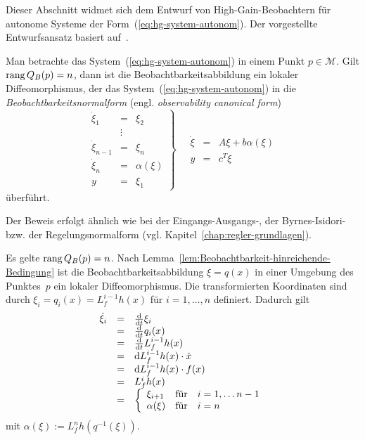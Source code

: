 Dieser Abschnitt widmet sich dem Entwurf von High-Gain-Beobachtern
für autonome Systeme der Form~(\ref{eq:hg-system-autonom}). Der
vorgestellte Entwurfsansatz basiert auf~\cite{gauthier92,ciccarella93,dalla-mora1997}.
\begin{theorem}
\label{thm:hg-beobachtbarkeitsnormalform}Man betrachte das System~(\ref{eq:hg-system-autonom})
in einem Punkt $p\in\mathcal{M}$. Gilt ${\operatorname{rang}}\,Q_{B}(p)=n$, dann
ist die Beobachtbarkeitsabbildung ein lokaler Diffeomorphismus, der
das System~(\ref{eq:hg-system-autonom}) in die \emph{Beobachtbarkeitsnormalform}
(engl. \emph{observability canonical form})
\begin{equation}
\left.\begin{array}{lcl}
\dot{\xi}_{1} & = & \xi_{2}\\
 & \vdots\\
\dot{\xi}_{n-1} & = & \xi_{n}\\
\dot{\xi}_{n} & = & \alpha(\xi)\\
y & = & \xi_{1}
\end{array}\right\} \quad\begin{array}{rcl}
\dot{\xi} & = & A\xi+b\alpha(\xi)\\
y & = & c^{T}\xi
\end{array}\label{eq:Beobachtbarkeits-NF-autonom}
\end{equation}
überführt.
\end{theorem}
Der Beweis erfolgt ähnlich wie bei der Eingangs-Ausgangs-, der Byrnes-Isidori-
bzw. der Regelungsnormalform (vgl. Kapitel~\ref{chap:regler-grundlagen}).
\begin{svmultproof2}
Es gelte ${\operatorname{rang}}\,Q_{B}(p)=n$. Nach Lemma~\ref{lem:Beobachtbarkeit-hinreichende-Bedingung}
ist die Beobachtbarkeitsabbildung $\xi=q(x)$ in einer Umgebung des
Punktes~$p$ ein lokaler Diffeomorphismus. Die transformierten Koordinaten
sind durch $\xi_{i}=q_{i}(x)=L_{f}^{i-1}h(x)$ für $i=1,\ldots,n$
definiert. Dadurch gilt
\[
\begin{array}{lcl}
\dot{\xi}_{i} & = & \frac{{\mathrm{d}}}{{\mathrm{d}} t}\xi_{i}\\
 & = & \frac{{\mathrm{d}}}{{\mathrm{d}} t}q_{i}(x)\\
 & = & \frac{{\mathrm{d}}}{{\mathrm{d}} t}L_{f}^{i-1}h(x)\\
 & = & {\mathrm{d}} L_{f}^{i-1}h(x)\cdot\dot{x}\\
 & = & {\mathrm{d}} L_{f}^{i-1}h(x)\cdot f(x)\\
 & = & L_{f}^{i}h(x)\\
 & = & \left\{ \begin{array}{lcl}
\xi_{i+1} & \text{für} & i=1,\ldots n-1\\
\alpha(\xi) & \text{für} & i=n
\end{array}\right.
\end{array}
\]
mit $\alpha(\xi):=L_{f}^{n}h(q^{-1}(\xi))$.
\end{svmultproof2}

